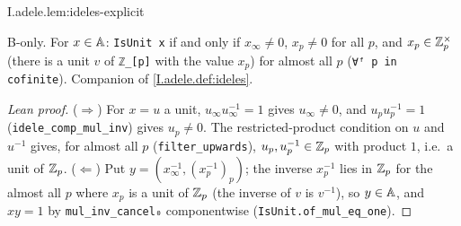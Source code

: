 \begin{lemma}
\bonly
{}
\end{lemma}
\begin{tfformal}{I.adele.lem:ideles-explicit}
\begin{tffidelity}
B-only. For $x\in\mathbb{A}$: \texttt{IsUnit x} if and only if $x_\infty\neq0$, $x_p\neq0$ for all $p$, and $x_p\in\mathbb{Z}_p^\times$ (there is a unit $v$ of \texttt{ℤ\_[p]} with the value $x_p$) for almost all $p$ (\texttt{∀ᶠ p in cofinite}). Companion of \cref{I.adele.def:ideles}.
\end{tffidelity}
\end{tfformal}
\begin{proof}[Lean proof]
($\Rightarrow$) For $x=u$ a unit, $u_\infty u^{-1}_\infty=1$ gives $u_\infty\ne0$, and $u_pu^{-1}_p=1$ (\texttt{idele\_comp\_mul\_inv}) gives $u_p\ne0$. The restricted-product condition on $u$ and $u^{-1}$ gives, for almost all $p$ (\texttt{filter\_upwards}), $u_p,u^{-1}_p\in\mathbb{Z}_p$ with product $1$, i.e.\ a unit of $\mathbb{Z}_p$. ($\Leftarrow$) Put $y=(x_\infty^{-1},(x_p^{-1})_p)$; the inverse $x_p^{-1}$ lies in $\mathbb{Z}_p$ for the almost all $p$ where $x_p$ is a unit of $\mathbb{Z}_p$ (the inverse of $v$ is $v^{-1}$), so $y\in\mathbb{A}$, and $xy=1$ by \texttt{mul\_inv\_cancel₀} componentwise (\texttt{IsUnit.of\_mul\_eq\_one}).
\end{proof}

